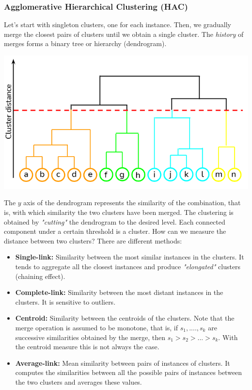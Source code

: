 \subsubsection{Agglomerative Hierarchical Clustering (HAC)}
Let's start with singleton clusters, one for each instance. Then, we gradually merge the closest pairs of clusters until we obtain a single cluster. The \textit{history} of merges forms a binary tree or hierarchy (dendrogram).
\begin{center}
    \includegraphics[scale=0.4]{images/HAC.png}
\end{center}
The $y$ axis of the dendrogram represents the similarity of the combination, that is, with which similarity the two clusters have been merged. The clustering is obtained by \textit{"cutting"} the dendrogram to the desired level. Each connected component under a certain threshold is a cluster.\newline\newline 
How can we measure the distance between two clusters? There are different methods:
\begin{itemize}
    \item \textbf{Single-link:} Similarity between the most similar instances in the clusters. It tends to aggregate all the closest instances and produce \textit{"elongated"} clusters (chaining effect).
    \item \textbf{Complete-link:} Similarity between the most distant instances in the clusters. It is sensitive to outliers.
    \item \textbf{Centroid:} Similarity between the centroids of the clusters. Note that the merge operation is assumed to be monotone, that is, if $s_{1},....,s_{k}$ are successive similarities obtained by the merge, then $s_{1} > s_{2} > ... > s_{k}$. With the centroid measure this is not always the case.
    \item \textbf{Average-link:} Mean similarity between pairs of instances of clusters. It computes the similarities between all the possible pairs of instances between the two clusters and averages these values.
\end{itemize}
